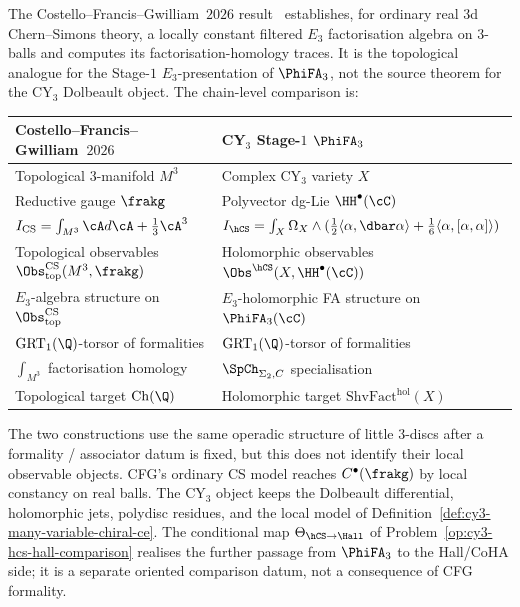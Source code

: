 \begin{remark}
\label{rem:cfg2026-topological-CS-side-by-side-e3-torsor}
The Costello--Francis--Gwilliam~$2026$ result~\cite{CFG2026} establishes, for ordinary real $3$d Chern--Simons theory, a locally constant filtered $E_3$ factorisation algebra on $3$-balls and computes its factorisation-homology traces. It is the topological analogue for the Stage-$1$ $E_3$-presentation of $\PhiFA_3$, not the source theorem for the CY$_3$ Dolbeault object. The chain-level comparison is:
\begin{center}
\small
\begin{tabular}{ll}
\toprule
Costello--Francis--Gwilliam~$2026$ & CY$_3$ Stage-$1$ $\PhiFA_3$ \\
\midrule
Topological $3$-manifold $M^3$ & Complex CY$_3$ variety $X$ \\
Reductive gauge $\frakg$ & Polyvector dg-Lie $\HH^\bullet(\cC)$ \\
$I_{\mathrm{CS}} = \int_{M^3} \cA d\cA + \tfrac{1}{3}\cA^3$ & $I_{\hCS} = \int_X \Omega_X \wedge (\tfrac{1}{2}\langle \alpha, \dbar\alpha\rangle + \tfrac{1}{6}\langle \alpha, [\alpha, \alpha]\rangle)$ \\
Topological observables $\Obs^{\mathrm{CS}}_{\mathrm{top}}(M^3, \frakg)$ & Holomorphic observables $\Obs^{\hCS}(X, \HH^\bullet(\cC))$ \\
$E_3$-algebra structure on $\Obs^{\mathrm{CS}}_{\mathrm{top}}$ & $E_3$-holomorphic FA structure on $\PhiFA_3(\cC)$ \\
$\mathrm{GRT}_1(\Q)$-torsor of formalities & $\mathrm{GRT}_1(\Q)$-torsor of formalities \\
$\int_{M^3}$ factorisation homology & $\SpCh_{\Sigma_2, C}$ specialisation \\
Topological target $\mathrm{Ch}(\Q)$ & Holomorphic target $\mathrm{ShvFact}^{\mathrm{hol}}(X)$ \\
\bottomrule
\end{tabular}
\end{center}
The two constructions use the same operadic structure of little $3$-discs
after a formality / associator datum is fixed, but this does not identify
their local observable objects. CFG's ordinary CS model reaches
$C^\bullet(\frakg)$ by local constancy on real balls. The CY$_3$ object
keeps the Dolbeault differential, holomorphic jets, polydisc residues, and
the local model of Definition~\ref{def:cy3-many-variable-chiral-ce}. The
conditional map $\Theta_{\hCS \to \Hall}$ of
Problem~\ref{op:cy3-hcs-hall-comparison} realises the further passage from
$\PhiFA_3$ to the Hall/CoHA side; it is a separate oriented comparison
datum, not a consequence of CFG formality.
\end{remark}

